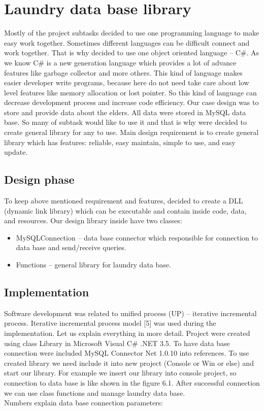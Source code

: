 %
\section{Laundry data base library}

Mostly of the project subtasks decided to use one programming language to make easy work together. Sometimes different languages can be difficult connect and work together. That is why decided to use one object oriented language – C\#. As we know C\# is a new generation language which provides a lot of advance features like garbage collector and more others. This kind of language makes easier developer write programs, because here do not need take care about low level features like memory allocation or lost pointer. So this kind of language can decrease development process and increase code efficiency. 
Our case design was to store and provide data about the elders. All data were stored in MySQL data base. So many of subtask would like to use it and that is why were decided to create general library for any to use. Main design requirement is to create general library which has features:  reliable, easy maintain, simple to use, and easy update.

\subsection{Design phase}

To keep above mentioned requirement and features, decided to create a DLL (dynamic link library) which can be executable and contain inside code, data, and resources. Our design library inside have two classes:

\begin{itemize}
	\item MySQLConnection – data base connector which responsible for connection to data base and send/receive queries.
	\item Functions – general library for laundry data base.
\end{itemize}

\subsection{Implementation}

Software development was related to unified process (UP) – iterative incremental process.  Iterative incremental process model [5] was used during the implementation.  
Let us explain everything in more detail. Project were created using class Library in Microsoft Visual C\# .NET 3.5. To have data base connection were included MySQL Connector Net 1.0.10 into references. To use created library we need include it into new project (Console or Win or else) and start our library. For example we insert our library into console project, so connection to data base is like shown in the figure 6.1. After successful connection we can use class functions and manage laundry data base. \\ Numbers explain data base connection parameters: 

